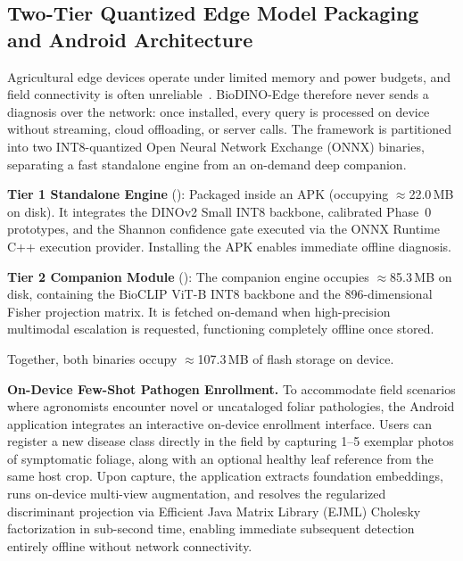 \subsection{Two-Tier Quantized Edge Model Packaging and Android Architecture}
\label{sec:packaging}
Agricultural edge devices operate under limited memory and power budgets, and field connectivity is often unreliable~\cite{sharif2026real,radocaj2025evolution}. BioDINO-Edge therefore never sends a diagnosis over the network: once installed, every query is processed on device without streaming, cloud offloading, or server calls. The framework is partitioned into two INT8-quantized Open Neural Network Exchange (ONNX) binaries, separating a fast standalone engine from an on-demand deep companion.

\textbf{Tier 1 Standalone Engine} (): Packaged inside an APK (occupying $\approx$22.0\,MB on disk). It integrates the DINOv2 Small INT8 backbone, calibrated Phase~0 prototypes, and the Shannon confidence gate executed via the ONNX Runtime C++ execution provider. Installing the APK enables immediate offline diagnosis.

\textbf{Tier 2 Companion Module} (): The companion engine occupies $\approx$85.3\,MB on disk, containing the BioCLIP ViT-B INT8 backbone and the 896-dimensional Fisher projection matrix. It is fetched on-demand when high-precision multimodal escalation is requested, functioning completely offline once stored.

Together, both binaries occupy $\approx$107.3\,MB of flash storage on device.

\textbf{On-Device Few-Shot Pathogen Enrollment.} To accommodate field scenarios where agronomists encounter novel or uncataloged foliar pathologies, the Android application integrates an interactive on-device enrollment interface. Users can register a new disease class directly in the field by capturing 1--5 exemplar photos of symptomatic foliage, along with an optional healthy leaf reference from the same host crop. Upon capture, the application extracts foundation embeddings, runs on-device multi-view augmentation, and resolves the regularized discriminant projection via Efficient Java Matrix Library (EJML) Cholesky factorization in sub-second time, enabling immediate subsequent detection entirely offline without network connectivity.

